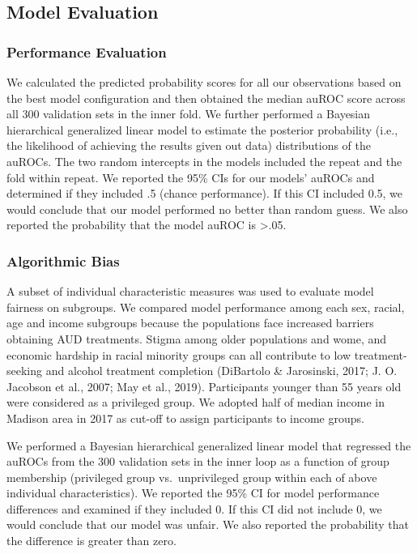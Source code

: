 \documentclass[
  letterpaper,
  DIV=11,
  numbers=noendperiod]{scrartcl}
\begin{document}
\subsection{Model Evaluation}\label{model-evaluation}

\subsubsection{Performance Evaluation}\label{performance-evaluation}

We calculated the predicted probability scores for all our observations
based on the best model configuration and then obtained the median auROC
score across all 300 validation sets in the inner fold. We further
performed a Bayesian hierarchical generalized linear model to estimate
the posterior probability (i.e., the likelihood of achieving the results
given out data) distributions of the auROCs. The two random intercepts
in the models included the repeat and the fold within repeat. We
reported the 95\% CIs for our models' auROCs and determined if they
included .5 (chance performance). If this CI included 0.5, we would
conclude that our model performed no better than random guess. We also
reported the probability that the model auROC is \textgreater.05.

\subsubsection{Algorithmic Bias}\label{algorithmic-bias}

A subset of individual characteristic measures was used to evaluate
model fairness on subgroups. We compared model performance among each
sex, racial, age and income subgroups because the populations face
increased barriers obtaining AUD treatments. Stigma among older
populations and wome, and economic hardship in racial minority groups
can all contribute to low treatment-seeking and alcohol treatment
completion (DiBartolo \& Jarosinski, 2017; J. O. Jacobson et al., 2007;
May et al., 2019). Participants younger than 55 years old were
considered as a privileged group. We adopted half of median income in
Madison area in 2017 as cut-off to assign participants to income groups.

We performed a Bayesian hierarchical generalized linear model that
regressed the auROCs from the 300 validation sets in the inner loop as a
function of group membership (privileged group vs.~unprivileged group
within each of above individual characteristics). We reported the 95\%
CI for model performance differences and examined if they included 0. If
this CI did not include 0, we would conclude that our model was unfair.
We also reported the probability that the difference is greater than
zero.
\end{document}
